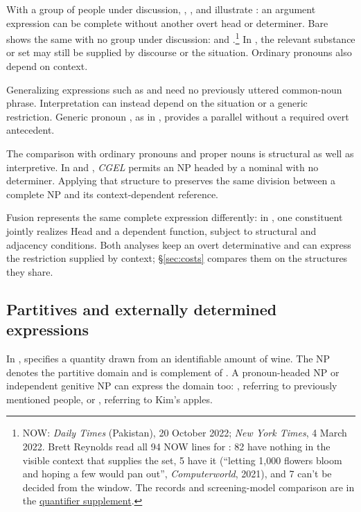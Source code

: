 \documentclass[12pt]{article}
\begin{document}
With a group of people under discussion, , , and  illustrate : an argument expression can be complete without another overt head or determiner. Bare  shows the same with no group under discussion:  and .\footnote{NOW: \textit{Daily Times} (Pakistan), 20 October 2022; \textit{New York Times}, 4 March 2022. Brett Reynolds read all 94 NOW lines for : 82 have nothing in the visible context that supplies the set, 5 have it (\enquote{letting 1,000 flowers bloom and hoping a few would pan out}, \textit{Computerworld}, 2021), and 7 can't be decided from the window. The records and screening-model comparison are in the \href{run:quantifier-controls.pdf}{quantifier supplement}.} In , the relevant substance or set may still be supplied by discourse or the situation. Ordinary pronouns also depend on context.

Generalizing expressions such as  and  need no previously uttered common-noun phrase. Interpretation can instead depend on the situation or a generic restriction. Generic pronoun , as in , provides a parallel without a required overt antecedent.

The comparison with ordinary pronouns and proper nouns is structural as well as interpretive. In  and , \textit{CGEL} permits an NP headed by a nominal with no determiner. Applying that structure to  preserves the same division between a complete NP and its context-dependent reference.

Fusion represents the same complete expression differently: in \textcite{Payne2007}, one constituent jointly realizes Head and a dependent function, subject to structural and adjacency conditions. Both analyses keep an overt determinative and can express the restriction supplied by context; §\ref{sec:costs} compares them on the structures they share.

\subsection{Partitives and externally determined expressions}\label{sec:modification}

In ,  specifies a quantity drawn from an identifiable amount of wine. The NP  denotes the partitive domain and is complement of . A pronoun-headed NP or independent genitive NP can express the domain too: , referring to previously mentioned people, or , referring to Kim's apples.
\end{document}

